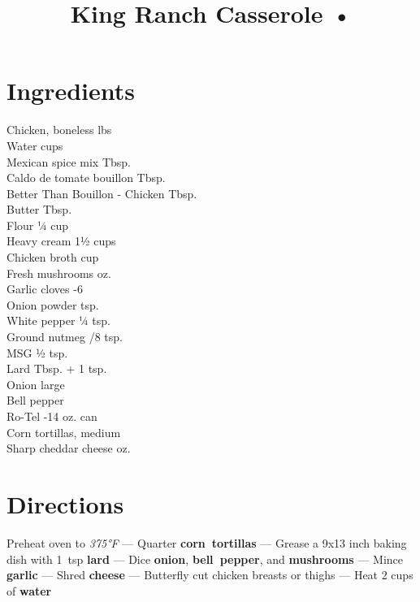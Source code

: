 \documentclass[11pt,letterpaper]{article}
\title{King Ranch Casserole •}
\author{}
\date{}
\begin{document}
\maketitle
\thispagestyle{empty}

\section*{Ingredients}
\setlength{\columnsep}{20pt}
\begin{multicols}{2}
\noindent
    Chicken, boneless  lbs \\
    Water  cups \\
    Mexican spice mix  Tbsp. \\
    Caldo de tomate bouillon  Tbsp. \\
    Better Than Bouillon - Chicken  Tbsp. \\
    Butter  Tbsp. \\
    Flour \dotfill ¼ cup \\
    Heavy cream \dotfill 1½ cups \\
    Chicken broth  cup \\
    Fresh mushrooms  oz. \\
    Garlic cloves -6 \\
    \columnbreak
    Onion powder  tsp. \\
    White pepper \dotfill ¼ tsp. \\
    Ground nutmeg /8 tsp. \\
    MSG \dotfill ½ tsp. \\
    Lard  Tbsp. + 1 tsp. \\
    Onion  large \\
    Bell pepper  \\
    Ro-Tel -14 oz. can \\
    Corn tortillas, medium  \\
    Sharp cheddar cheese  oz. \\
\end{multicols}

\section*{Directions}

\noindent
Preheat oven to \textit{375°F} ---
Quarter \textbf{corn~tortillas} ---
Grease a 9x13 inch baking dish with 1~tsp \textbf{lard} ---
Dice \textbf{onion}, \textbf{bell~pepper}, and \textbf{mushrooms} ---
Mince \textbf{garlic} ---
Shred \textbf{cheese} ---
Butterfly cut chicken breasts or thighs ---
Heat 2 cups of \textbf{water}
\end{document}
